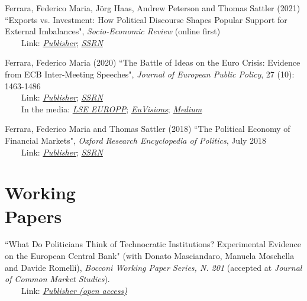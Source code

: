 \documentclass[margin, line]{res}
\begin{document}
\begin{resume}
Ferrara, Federico Maria, J{\"o}rg Haas, Andrew Peterson and Thomas Sattler (2021) ``Exports vs. Investment: How Political Discourse Shapes Popular Support for External Imbalances", \textit{Socio-Economic Review} (online first)\\  \-\ \-\ \-\ \-\ Link: \href{https://academic.oup.com/ser/advance-article-abstract/doi/10.1093/ser/mwab004/6154354}{\textit{Publisher}}; \href{https://papers.ssrn.com/sol3/papers.cfm?abstract_id=3298742}{\textit{SSRN}}

Ferrara, Federico Maria (2020) ``The Battle of Ideas on the Euro Crisis: Evidence from ECB Inter-Meeting Speeches", \textit{Journal of European Public Policy}, 27 (10): 1463-1486 \\  \-\ \-\ \-\ \-\ Link: \href{https://www.tandfonline.com/doi/full/10.1080/13501763.2019.1670231}{\textit{Publisher}}; \href{https://papers.ssrn.com/sol3/papers.cfm?abstract_id=3323844}{\textit{SSRN}}\\  \-\ \-\ \-\  \-\ In the media: \href{https://blogs.lse.ac.uk/europpblog/2020/03/12/what-ecb-speeches-tell-us-about-the-battle-of-ideas-during-the-eurozone-crisis/}{\textit{LSE EUROPP}}; \href{http://www.euvisions.eu/through-meeting-speeches/}{\textit{EuVisions}}; \href{https://medium.com/euvisions/the-battle-of-ideas-on-the-euro-crisis-through-the-lenses-of-ecb-inter-meeting-speeches-52c0d22621e6}{\textit{Medium}}

Ferrara, Federico Maria and Thomas Sattler (2018) ``The Political Economy of Financial Markets", \textit{Oxford Research Encyclopedia of Politics}, July 2018 \\  \-\ \-\ \-\ \-\ Link: \href{https://oxfordre.com/politics/view/10.1093/acrefore/9780190228637.001.0001/acrefore-9780190228637-e-628}{\textit{Publisher}}; \href{https://papers.ssrn.com/sol3/papers.cfm?abstract_id=3289339}{\textit{SSRN}}

\clearpage

\section{\sc Working \\ Papers}

``What Do Politicians Think of Technocratic Institutions? Experimental Evidence on the European Central Bank" (with Donato Masciandaro, Manuela Moschella and Davide Romelli), \textit{Bocconi Working Paper Series, N. 201} (accepted at \textit{Journal of Common Market Studies}). \\ \-\ \-\ \-\ \-\ Link: \href{https://repec.unibocconi.it/baffic/baf/papers/cbafwp23201.pdf}{\textit{Publisher (open access)}}


\end{resume}
\end{document}

